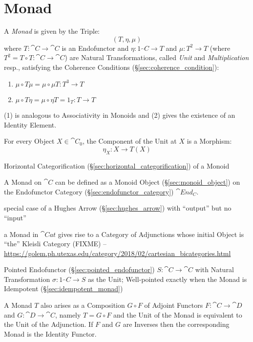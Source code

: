 \section{Monad}\label{sec:monad}

A \emph{Monad} is given by the Triple:
\[
  (T, \eta, \mu)
\]
where $T : \cat{C} \rightarrow \cat{C}$ is an Endofunctor and $\eta :
1_\cat{C} \rightarrow T$ and $\mu : T^2 \rightarrow T$ (where $T^2 = T
\circ T : \cat{C} \rightarrow \cat{C}$) are Natural Transformations,
called \emph{Unit} and \emph{Multiplication} resp., satisfying the
Coherence Conditions (\S\ref{sec:coherence_condition}):
\begin{enumerate}
  \item $\mu \circ T\mu = \mu \circ \mu T : T^3 \rightarrow T$
  \item $\mu \circ T\eta = \mu \circ \eta T = 1_T : T \rightarrow T$
\end{enumerate}
(1) is analogous to Associativity in Monoids and (2) gives the
existence of an Identity Element.

For every Object $X \in \cat{C}_0$, the Component of the Unit at $X$
is a Morphism:
\[
  \eta_X : X \rightarrow T (X)
\]

Horizontal Categorification (\S\ref{sec:horizontal_categorification})
of a Monoid

A Monad on $\cat{C}$ can be defined as a Monoid Object
(\S\ref{sec:monoid_object}) on the Endofunctor Category
(\S\ref{sec:endofunctor_category}) $\cat{End_C}$.

special case of a Hughes Arrow (\S\ref{sec:hughes_arrow}) with
``output'' but no ``input''

a Monad in $\cat{Cat}$ gives rise to a Category of Adjunctions whose initial
Object is ``the'' Kleisli Category (FIXME)
--\url{https://golem.ph.utexas.edu/category/2018/02/cartesian_bicategories.html}

Pointed Endofunctor (\S\ref{sec:pointed_endofunctor}) $S : \cat{C}
\rightarrow \cat{C}$ with Natural Transformation $\sigma : 1_\cat{C}
\rightarrow S$ as the Unit; Well-pointed exactly when the Monad is
Idempotent (\S\ref{sec:idempotent_monad})

A Monad $T$ also arises as a Composition $G \circ F$ of Adjoint
Functors $F : \cat{C} \rightarrow \cat{D}$ and $G : \cat{D}
\rightarrow \cat{C}$, namely $T = G \circ F$ and the Unit of the Monad
is equivalent to the Unit of the Adjunction. If $F$ and $G$ are
Inverses then the corresponding Monad is the Identity Functor.

